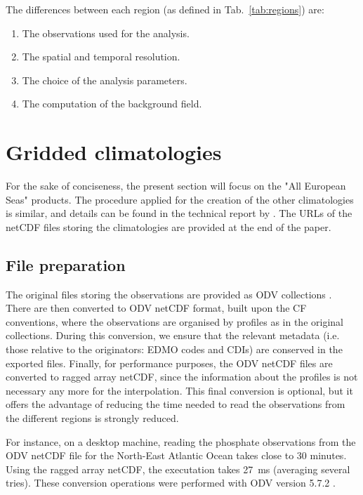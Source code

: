 \documentclass[essd, manuscript]{copernicus}
\begin{document}
The differences between each region (as defined in Tab.~\ref{tab:regions}) are:
\begin{enumerate}
\item The observations used for the analysis.
\item The spatial and temporal resolution.
\item The choice of the analysis parameters.
\item The computation of the background field.
\end{enumerate}

\section{Gridded climatologies\label{sec:clim}}

For the sake of conciseness, the present section will focus on the "All European Seas" products. The procedure applied for the creation of the other climatologies is similar, and details can be found in the technical report by \citep{BUGA2021}. The URLs of the netCDF files storing the climatologies are provided at the end of the paper.

\subsection{File preparation}

The original files storing the observations are provided as ODV collections \citep[Ocean Data View,][]{SCHLITZER2002}. There are then converted to ODV netCDF format, built upon the CF conventions, where the observations are organised by profiles as in the original collections. During this conversion, we ensure that the relevant metadata (i.e. those relative to the originators: EDMO codes and CDIs) are conserved in the exported files. Finally, for performance purposes, the ODV netCDF files are converted to ragged array netCDF, since the information about the profiles is not necessary any more for the interpolation. This final conversion is optional, but it offers the advantage of reducing the time needed to read the observations from the different regions is strongly reduced.

For instance, on a desktop machine, reading the phosphate observations from the ODV netCDF file for the North-East Atlantic Ocean takes close to 30 minutes. Using the ragged array netCDF, the executation takes 27~ms (averaging several tries). These conversion operations were performed with ODV version 5.7.2 \citep{Schlitzer2024}.
\end{document}
